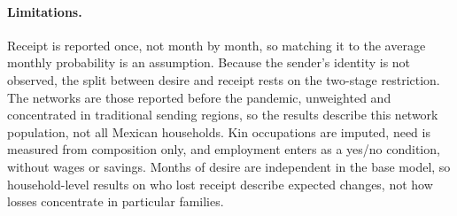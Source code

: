 \paragraph{Limitations.} Receipt is reported once, not month by month, so matching it to the average monthly probability is an assumption. Because the sender's identity is not observed, the split between desire and receipt rests on the two-stage restriction. The networks are those reported before the pandemic, unweighted and concentrated in traditional sending regions, so the results describe this network population, not all Mexican households. Kin occupations are imputed, need is measured from composition only, and employment enters as a yes/no condition, without wages or savings. Months of desire are independent in the base model, so household-level results on who lost receipt describe expected changes, not how losses concentrate in particular families.
